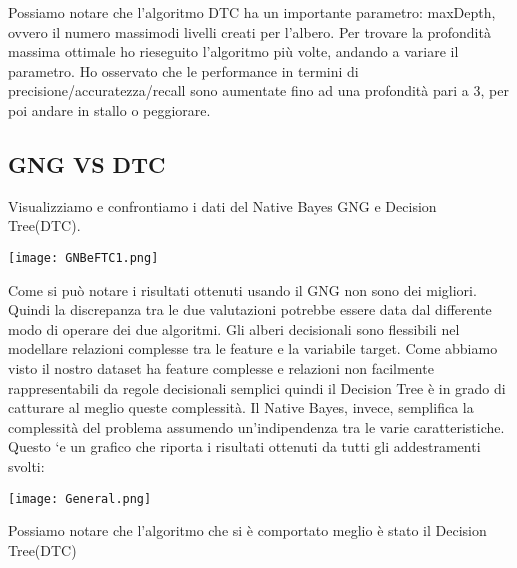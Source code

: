 \documentclass{article}
\begin{document}
Possiamo notare che l’algoritmo DTC ha un importante parametro: maxDepth, ovvero il numero massimodi livelli creati per l’albero. Per trovare la profondità massima ottimale ho rieseguito l’algoritmo più volte, andando a variare il parametro. Ho osservato che le performance in termini di precisione/accuratezza/recall sono aumentate fino ad una profondità pari a 3, per poi andare in stallo o peggiorare.


\subsection{GNG VS DTC}

Visualizziamo e confrontiamo i dati del Native Bayes GNG e Decision Tree(DTC).
\begin{center}
  \texttt{[image: GNBeFTC1.png]}
\end{center}

Come si può notare i risultati ottenuti usando il GNG non sono dei migliori. Quindi la discrepanza tra le due valutazioni potrebbe essere data dal differente modo di operare dei due algoritmi. Gli alberi decisionali sono flessibili nel modellare relazioni complesse tra le feature e la variabile target. Come abbiamo visto  il nostro dataset ha feature complesse e relazioni non facilmente rappresentabili da regole decisionali semplici quindi il Decision Tree è in grado di catturare al meglio queste complessità. Il Native Bayes, invece, semplifica la complessità del problema assumendo un'indipendenza tra le varie caratteristiche. Questo `e un grafico che riporta i risultati ottenuti da tutti gli addestramenti
svolti:
\begin{center}
  \texttt{[image: General.png]}
\end{center}

Possiamo notare che l'algoritmo che si è comportato meglio è stato il Decision Tree(DTC)
\end{document}

